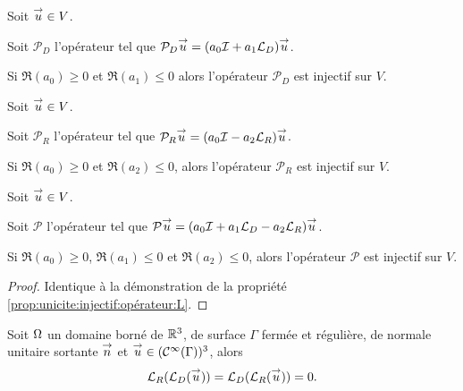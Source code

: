   \begin{prop}
    \label{prop:unicite:injectif:opérateur:LD}
    Soit \({\overset{\rightarrow}{u}} \in V\).

    Soit \(\mathcal{P}_D\) l'opérateur tel que \(\mathcal{P}_D{\overset{\rightarrow}{u}} = (a_0{\mathcal{I}} + a_1 {\mathcal{L}_D}){\overset{\rightarrow}{u}}\).

    Si \(\Re(a_0)\ge 0\) et \(\Re(a_1)\le 0\) alors l'opérateur \(\mathcal{P}_D\) est injectif sur \(V\).
  \end{prop}
  \begin{prop}
    \label{prop:unicite:injectif:opérateur:LR}
    Soit \({\overset{\rightarrow}{u}} \in V\).

    Soit \(\mathcal{P}_R\) l'opérateur tel que \(\mathcal{P}_R{\overset{\rightarrow}{u}} = (a_0{\mathcal{I}} - a_2 {\mathcal{L}_R}){\overset{\rightarrow}{u}}\).

    Si \(\Re(a_0)\ge 0\) et \(\Re(a_2)\le 0\), alors l'opérateur \(\mathcal{P}_R\) est injectif sur \(V\).
  \end{prop}
  \begin{prop}
    \label{prop:unicite:injectif:opérateur:LD-LR}
    Soit \({\overset{\rightarrow}{u}} \in V\).
    
    Soit \(\mathcal{P}\) l'opérateur tel que \(\mathcal{P}{\overset{\rightarrow}{u}} = (a_0{\mathcal{I}} + a_1 {\mathcal{L}_D} - a_2{\mathcal{L}_R}){\overset{\rightarrow}{u}}\).

    Si \(\Re(a_0)\ge 0\), \(\Re(a_1)\le 0\) et \(\Re(a_2)\le 0\), alors l'opérateur \(\mathcal{P}\) est injectif sur \(V\).
  \end{prop}
  \begin{proof}
   Identique à la démonstration de la propriété \ref{prop:unicite:injectif:opérateur:L}.
  \end{proof}

  \begin{prop}
    Soit \(\Omega\) un domaine borné de \(\mathbb R^3\), de surface \(\Gamma\) fermée et régulière, de normale unitaire sortante \({\overset{\rightarrow}{n}}\) et \({\overset{\rightarrow}{u}} \in (\mathcal{C}^\infty(\Gamma))^3\), alors
    \begin{equation*}
        {\mathcal{L}_R}({\mathcal{L}_D}({\overset{\rightarrow}{u}})) = {\mathcal{L}_D}({\mathcal{L}_R}({\overset{\rightarrow}{u}})) = 0.
    \end{equation*}
  \end{prop}


